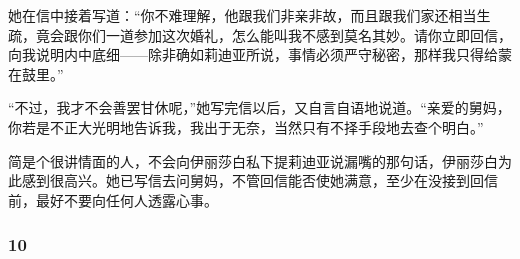 \par 她在信中接着写道：“你不难理解，他跟我们非亲非故，而且跟我们家还相当生疏，竟会跟你们一道参加这次婚礼，怎么能叫我不感到莫名其妙。请你立即回信，向我说明内中底细——除非确如莉迪亚所说，事情必须严守秘密，那样我只得给蒙在鼓里。”
\par “不过，我才不会善罢甘休呢，”她写完信以后，又自言自语地说道。“亲爱的舅妈，你若是不正大光明地告诉我，我出于无奈，当然只有不择手段地去查个明白。”
\par 简是个很讲情面的人，不会向伊丽莎白私下提莉迪亚说漏嘴的那句话，伊丽莎白为此感到很高兴。她已写信去问舅妈，不管回信能否使她满意，至少在没接到回信前，最好不要向任何人透露心事。



\subsubsection*{10}


